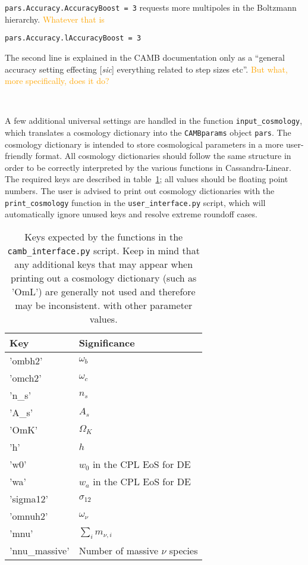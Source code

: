 \verb|pars.Accuracy.AccuracyBoost = 3| \quad requests more multipoles in the Boltzmann hierarchy. \textcolor{orange}{Whatever that is}

\verb|pars.Accuracy.lAccuracyBoost = 3|

The second line is explained in the CAMB documentation only as a ``general 
accuracy setting effecting [\textit{sic}] everything related to step sizes 
etc''. \textcolor{orange}{But what, more specifically, does it do?}

\

A few additional universal settings are handled in the function
\verb|input_cosmology|, which translates a cosmology dictionary into 
the \verb|CAMBparams| object \verb|pars|. The cosmology dictionary is
intended to store cosmological parameters in a more user-friendly format.
All cosmology dictionaries should follow the same structure in order to be 
correctly interpreted by the various functions in Cassandra-Linear. The required keys are described in table~\ref{tab: cosmology_dictionary}; all
values should be floating point numbers. The user is advised to print out
cosmology dictionaries with the \verb|print_cosmology| function in the
\verb|user_interface.py| script, which will automatically ignore unused keys
and resolve extreme roundoff cases.


\begin{table}[ht!]
\centering
\begin{tabular}{l|l}
\hline
Key & Significance \\ \hline
'ombh2' & $\omega_b$ \\
'omch2' & $\omega_c$ \\
'n\_s' & $n_s$ \\
'A\_s' & $A_s$ \\
'OmK' & $\Omega_K$ \\
'h' & $h$ \\
'w0' & $w_0$ in the CPL EoS for DE \\
'wa' & $w_a$ in the CPL EoS for DE \\
'sigma12' & $\sigma_{12}$\footnotemark \\
'omnuh2' & $\omega_\nu$ \\
'mnu' & $\sum_i m_{\nu, i}$ \\
'nnu\_massive' & Number of massive $\nu$ species \\ \hline
\end{tabular}
 \cprotect\caption[Cosmology Dictionary Keys]{Keys
 	expected by the functions in
 	the \verb|camb_interface.py| script. Keep in mind that any additional
 	keys that may appear when printing out a cosmology dictionary
 	(such as 'OmL') are generally not used and therefore may be inconsistent.
 	with other parameter values.}
 \label{tab: cosmology_dictionary}
\end{table}
 	
